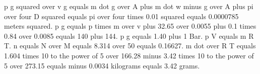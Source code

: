 p g squared over v g equals m dot g over A plus m dot w minus g over A plus pi over four D squared equals pi over four times 0.01 squared equals 0.0000785 meters squared.  
p g equals p times m over v plus 32.65 over 0.0055 plus 0.1 times 0.84 over 0.0085 equals 140 plus 144.  
p g equals 1.40 plus 1 Bar.  
p V equals m R T.  
n equals N over M equals 8.314 over 50 equals 0.16627.  
m dot over R T equals 1.604 times 10 to the power of 5 over 166.28 minus 3.42 times 10 to the power of 5 over 273.15 equals minus 0.0034 kilograms equals 3.42 grams.